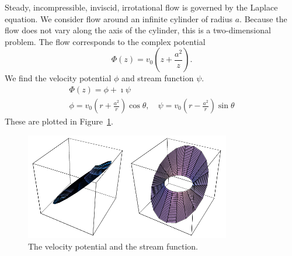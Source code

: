 \begin{Example}
  Steady, incompressible, inviscid, irrotational flow 
  is governed by the Laplace equation.  
  We consider flow around an infinite cylinder of radius $a$.  Because the
  flow does not vary along the axis of the cylinder, 
  this is a two-dimensional problem.  The flow
  corresponds to the complex potential
  \[
  \Phi(z) = v_0 \left( z + \frac{a^2}{z} \right).
  \]
  We find the velocity potential $\phi$ and stream function $\psi$.
  \begin{gather*}
    \Phi(z) = \phi + \imath \psi
    \\
    \phi = v_0 \left( r + \frac{a^2}{r} \right) \cos \theta, \quad 
    \psi = v_0 \left( r - \frac{a^2}{r} \right) \sin \theta
  \end{gather*}
  These are plotted in Figure~\ref{figure velocity-stream-v0za2z}.
  \begin{figure}[htb!]
    \begin{center}
      \includegraphics[width=0.8\textwidth]{fcv/analytic/velocity-stream-v0za2z}
    \end{center}
    \caption{The velocity potential and the stream function.}
    \label{figure velocity-stream-v0za2z}
  \end{figure}
  

\end{Example}

